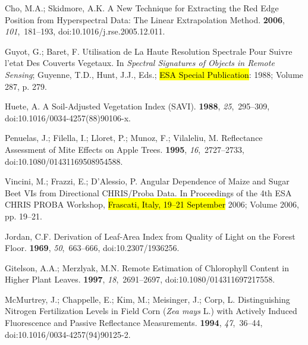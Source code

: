 \documentclass[remotesensing,article,accept,moreauthors,pdftex]{Definitions/mdpi}
\begin{document}
\begin{thebibliography}{999}
Cho, M.A.; Skidmore, A.K.
\newblock A New Technique for Extracting the Red Edge Position from
  Hyperspectral Data: The Linear Extrapolation Method.
 {\bf 2006}, {\em 101},~181--193, doi:10.1016/j.rse.2005.12.011.

Guyot, G.; Baret, F.
\newblock Utilisation de La Haute Resolution Spectrale Pour Suivre l'etat Des
  Couverts Vegetaux.
\newblock  In \emph{Spectral Signatures of Objects in Remote Sensing}; Guyenne, T.D.,
  Hunt, J.J., Eds.;  {\hl{ESA Special Publication}}: 1988; Volume 287, p. 279.

Huete, A.
\newblock A Soil-Adjusted Vegetation Index ({{SAVI}}).
 {\bf 1988}, {\em 25},~295--309, doi:10.1016/0034-4257(88)90106-x.

Penuelas, J.; Filella, I.; Lloret, P.; Munoz, F.; Vilaleliu, M.
\newblock Reflectance Assessment of Mite Effects on Apple Trees.
 {\bf 1995}, {\em
  16},~2727--2733, doi:10.1080/01431169508954588.

Vincini, M.; Frazzi, E.; D'Alessio, P.
\newblock Angular Dependence of Maize and Sugar Beet {{VIs}} from Directional
  {{CHRIS}}/{{Proba}} Data.
\newblock  In Proceedings of the 4th {{ESA CHRIS PROBA}} Workshop,  \hl{Frascati, Italy, 19--21 September} 2006; Volume 2006, pp.
  19--21.

Jordan, C.F.
\newblock Derivation of Leaf-Area Index from Quality of Light on the Forest
  Floor.
 {\bf 1969}, {\em 50},~663--666, doi:10.2307/1936256.

Gitelson, A.A.; Merzlyak, M.N.
\newblock Remote Estimation of Chlorophyll Content in Higher Plant Leaves.
 {\bf 1997}, {\em
  18},~2691--2697, doi:10.1080/014311697217558.

McMurtrey, J.; Chappelle, E.; Kim, M.; Meisinger, J.; Corp, L.
\newblock Distinguishing Nitrogen Fertilization Levels in Field Corn (\emph{{{Zea}}
  mays} {{L}}.) with Actively Induced Fluorescence and Passive Reflectance
  Measurements.
 {\bf 1994}, {\em 47},~36--44, doi:10.1016/0034-4257(94)90125-2.


\end{thebibliography}
\end{document}
